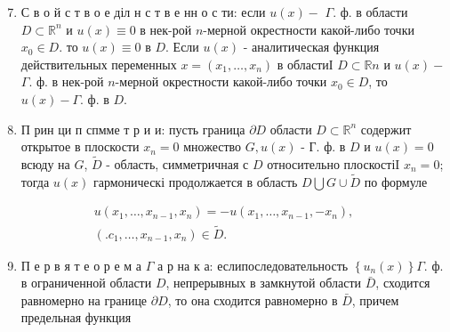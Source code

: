 \documentclass[10pt]{article}
\begin{document}
\begin{enumerate}

  \setcounter{enumi}{6}

  \item С в о й с т в о е діл н с т в е нн о с ти: если $u(x)-$ $\Gamma$. ф. в области $D \subset \mathbb{R}^{n}$ и $u(x) \equiv 0$ в нек-рой $n$-мерной окрестности какой-либо точки $x_{0} \in D$. то $u(x) \equiv 0$ в $D$. Если $u(x)$ - аналитическая функция действительных переменных $x=\left(x_{1}, \ldots, x_{n}\right)$ в областиІ $D \subset \mathbb{R} n$ и $u(x)-$ $\Gamma$. ф. в нек-рой $n$-мерной окрестности какой-либо точки $x_{0} \in D$, то $u(x)-\Gamma$. ф. в $D$.



  \item П рин ци п спмме т р и и: пусть граница $\partial D$ области $D \subset \mathbb{R}^{n}$ содержит открытое в плоскости $x_{n}=0$ множество $G, u(x)$ - Г. ф. в $D$ и $u(x)=0$ всюду на $G$, $\tilde{D}$ - область, симметричная с $D$ относительно плоскостіI $x_{n}=0$; тогда $u(x)$ гармоническі продолжается в область $D \bigcup G \cup \tilde{D}$ по формуле



\end{enumerate}



\[

\begin{gathered}

u\left(x_{1}, \ldots, x_{n-1}, x_{n}\right)=-u\left(x_{1}, \ldots, x_{n-1},-x_{n}\right), \\

\left(. c_{1}, \ldots, x_{n-1}, x_{n}\right) \in \tilde{D} .

\end{gathered}

\]



\begin{enumerate}

  \setcounter{enumi}{8}

  \item П е р в я т е о р е м а $\Gamma$ а р на к а: еслипоследовательность $\left\{u_{n}(x)\right\} \Gamma$. ф. в ограниченной области $D$, непрерывных в замкнутой области $\bar{D}$, сходится равномерно на границе $\partial D$, то она сходится равномерно в $\bar{D}$, причем предельная функция

\end{enumerate}
\end{document}
